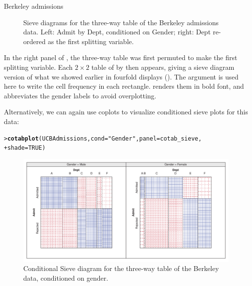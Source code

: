 \documentclass[10pt,krantz2]{krantz}\usepackage[]{graphicx}\usepackage[]{color}
\makeatletter
\newcommand{\hlnum}[1]{\textcolor[rgb]{0.686,0.059,0.569}{#1}}%
\newcommand{\hlstr}[1]{\textcolor[rgb]{0.192,0.494,0.8}{#1}}%
\newcommand{\hlstd}[1]{\textcolor[rgb]{0.345,0.345,0.345}{#1}}%
\newcommand{\hlkwc}[1]{\textcolor[rgb]{0.333,0.667,0.333}{#1}}%
\newcommand{\hlkwd}[1]{\textcolor[rgb]{0.737,0.353,0.396}{\textbf{#1}}}%
\newenvironment{kframe}{%
 \def\at@end@of@kframe{}%
 \ifinner\ifhmode%
  \def\at@end@of@kframe{\end{minipage}}%
  \begin{minipage}{\columnwidth}%
 \fi\fi%
 \def\FrameCommand##1{\hskip\@totalleftmargin \hskip-\fboxsep
 \colorbox{shadecolor}{##1}\hskip-\fboxsep
     \hskip-\linewidth \hskip-\@totalleftmargin \hskip\columnwidth}%
 \MakeFramed {\advance\hsize-\width
   \@totalleftmargin\z@ \linewidth\hsize
   \@setminipage}}%
 {\par\unskip\endMakeFramed%
 \at@end@of@kframe}
\newenvironment{knitrout}{}{} %
\renewenvironment{knitrout}{\small\renewcommand{\baselinestretch}{.85}}{} %
\makeatother
\begin{document}
\begin{Example}[berkeley3]{Berkeley admissions}
\begin{knitrout}
\begin{figure}[!htbp]
\caption[Sieve diagrams for the three-way table of the Berkeley admissions data]{Sieve diagrams for the three-way table of the Berkeley admissions data. Left: Admit by Dept, conditioned on Gender; right: Dept re-ordered as the first splitting variable.}\label{fig:berkeley-sieve}
\end{figure}


\end{knitrout}
In the right panel of , the three-way table
was first permuted to make  the first splitting variable.
Each $2 \times 2$ table of  by  then appears,
giving a sieve diagram version of what we showed earlier in
fourfold displays ().
The  argument is used here to write the cell frequency
in each rectangle.  renders them in bold font, and
 abbreviates the gender labels to avoid overplotting.

Alternatively, we can again use coplots to visualize conditioned sieve
plots for this data:

\begin{knitrout}
\color{fgcolor}\begin{kframe}
\begin{alltt}
\hlstd{> }\hlkwd{cotabplot}\hlstd{(UCBAdmissions,} \hlkwc{cond} \hlstd{=} \hlstr{"Gender"}\hlstd{,} \hlkwc{panel} \hlstd{= cotab_sieve,}
\hlstd{+ }          \hlkwc{shade} \hlstd{=} \hlnum{TRUE}\hlstd{)}
\end{alltt}
\end{kframe}\begin{figure}[!htbp]

\centerline{\includegraphics[width=\textwidth]{ch04/fig/berkeley-cotabsieve-1} }

\caption[Conditional Sieve diagram for the three-way table of the Berkeley data, conditioned on gender]{Conditional Sieve diagram for the three-way table of the Berkeley data, conditioned on gender.}\label{fig:berkeley-cotabsieve}
\end{figure}



\end{knitrout}
\end{Example}
\end{document}
